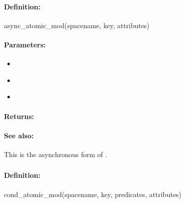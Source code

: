 \paragraph{Definition:}
\begin{rubycode}
async_atomic_mod(spacename, key, attributes)
\end{rubycode}

\paragraph{Parameters:}
\begin{itemize}[noitemsep]
\item {}\\

\item {}\\

\item {}\\

\end{itemize}

\paragraph{Returns:}


\paragraph{See also:}  This is the asynchronous form of .

\pagebreak
\subsubsection{}
\label{api:ruby:cond_atomic_mod}


\paragraph{Definition:}
\begin{rubycode}
cond_atomic_mod(spacename, key, predicates, attributes)
\end{rubycode}

